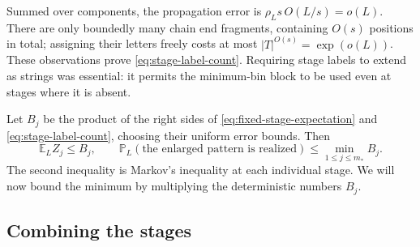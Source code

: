 Summed over components, the propagation error is
$\rho_Ls\,O(L/s)=o(L)$.  There are only boundedly many chain end
fragments, containing $O(s)$ positions in total; assigning their
letters freely costs at most $|T|^{O(s)}=\exp(o(L))$.
These observations prove \eqref{eq:stage-label-count}.  Requiring
stage labels to extend as strings was essential: it permits the
minimum-bin block to be used even at stages where it is absent.

Let $B_j$ be the product of the right sides of
\eqref{eq:fixed-stage-expectation} and
\eqref{eq:stage-label-count}, choosing their uniform error bounds.
Then
\begin{equation}\label{eq:stage-markov}
 \mathbb E_L Z_j\leq B_j,
 \qquad
 \mathbb P_L(\text{the enlarged pattern is realized})
 \leq\min_{1\leq j\leq m_*}B_j.
\end{equation}
The second inequality is Markov's inequality at each individual stage.
We will now bound the minimum by multiplying the deterministic numbers
$B_j$.

\subsection{Combining the stages}

